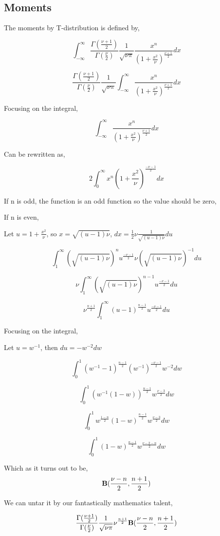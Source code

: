 \documentclass{article}
\begin{document}
\subsection{Moments}
The moments by T-distribution is defined by,

$$\int_{-\infty}^{\infty}\frac{\Gamma(\frac{\nu+1}{2})}{\Gamma(\frac{\nu}{2})} \frac{1}{\sqrt{\nu \pi}} \frac{x^n}{(1+\frac{x^2}{\nu})^{\frac{\nu+1}{2}}}dx$$

$$\frac{\Gamma(\frac{\nu+1}{2})}{\Gamma(\frac{\nu}{2})} \frac{1}{\sqrt{\nu \pi}} \int_{-\infty}^{\infty} \frac{x^n}{(1+\frac{x^2}{\nu})^{\frac{\nu+1}{2}}}dx$$

Focusing on the integral, 

$$\int_{-\infty}^{\infty} \frac{x^n}{(1+\frac{x^2}{\nu})^{\frac{\nu+1}{2}}}dx$$

Can be rewritten as,

$$2 \int_{0}^{\infty} x^n {(1+\frac{x^2}{\nu})^{\frac{-\nu-1}{2}}} dx$$

If n is odd, the function is an odd function so the value should be zero,

If n is even,

Let $u = 1+\frac{x^2}{\nu}$, so $x = \sqrt{(u-1) \nu}$, $dx = \frac{1}{2}\nu \frac{1}{\sqrt{(u-1) \nu}}du$

$$ \int_{1}^{\infty} ( \sqrt{(u-1) \nu})^n {u^{\frac{-\nu-1}{2}}} \nu{(\sqrt{(u-1) \nu})}^{-1}du$$

$$ \nu \int_{1}^{\infty} ( \sqrt{(u-1) \nu})^{n-1} {u^{\frac{-\nu-1}{2}}}  du$$

$$  \nu^{\frac{n+1}{2}} \int_{1}^{\infty} {(u-1)}^{\frac{n-1}{2}} {u^{\frac{-\nu-1}{2}}}  du$$

Focusing on the integral,

Let $u = w^{-1}$, then $du = -w^{-2} dw$

$$\int_{0}^{1} {(w^{-1}-1)}^{\frac{n-1}{2}} {(w^{-1})^{\frac{-\nu-1}{2}}}  w^{-2} dw$$

$$\int_{0}^{1} {(w^{-1}(1-w))}^{\frac{n-1}{2}} {w^{\frac{\nu-3}{2}}}   dw$$

$$\int_{0}^{1} {w^{\frac{1-n}{2}} (1-w)}^{\frac{n-1}{2}} {w^{\frac{\nu-3}{2}}}   dw$$

$$\int_{0}^{1} { (1-w)}^{\frac{n-1}{2}} {w^{\frac{\nu-2-n}{2}}}   dw$$

Which as it turns out to be, 
$${\bf B}(\frac{\nu-n}{2},\frac{n+1}{2})$$

We can untar it by our fantastically mathematics talent, 

$$ \frac{\Gamma(\frac{\nu+1}{2})}{\Gamma(\frac{\nu}{2})} \frac{1}{\sqrt{\nu \pi}} \nu^{\frac{n+1}{2}} {\bf B}(\frac{\nu-n}{2},\frac{n+1}{2})$$
\end{document}
